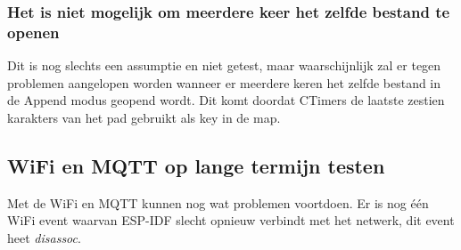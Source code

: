 \subsubsection*{Het is niet mogelijk om meerdere keer het zelfde bestand te openen}

Dit is nog slechts een assumptie en niet getest, maar waarschijnlijk zal er tegen problemen aangelopen worden wanneer er meerdere keren het zelfde bestand in de Append modus geopend wordt. Dit komt doordat CTimers de laatste zestien karakters van het pad gebruikt als key in de map.

\subsection*{WiFi en MQTT op lange termijn testen}

Met de WiFi en MQTT kunnen nog wat problemen voortdoen. Er is nog één WiFi event waarvan ESP-IDF slecht opnieuw verbindt met het netwerk, dit event heet \emph{disassoc}.
